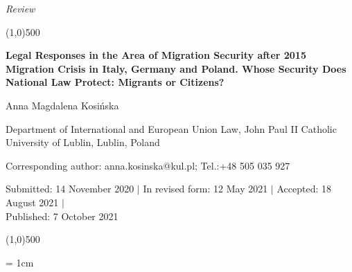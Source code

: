 \documentclass[10pt,a4paper]{article}
\begin{document}
\flushcolumns
\raggedcolumns



\pagestyle{document}
\thispagestyle{firstpage}


\vspace*{70pt}

\setlength{\parindent}{0cm}
\textit{Review}
\vspace*{-12pt}

\begin{center}
\line(1,0){500}
\end{center}

\vspace*{12pt}
\begin{flushleft}
\begin{LARGE}
\textbf{{\color{LibrelloColor} Legal Responses in the Area of Migration Security after 2015 Migration Crisis in Italy, Germany and Poland. Whose Security Does National Law Protect: Migrants or Citizens? }} 
\end{LARGE}

\vspace*{12pt}

Anna Magdalena Kosińska

\vspace*{6pt}

Department of International and European Union Law, John Paul II Catholic University of Lublin, Lublin, Poland

\vspace*{6pt}

Corresponding author: anna.kosinska@kul.pl; Tel.:+48 505 035 927 

\vspace*{6pt}

Submitted: 14 November 2020 $\mid$ In revised form: 12 May 2021 $\mid$ Accepted: 18 August 2021 $\mid$\\
Published:  7 October 2021
\end{flushleft}
\setcounter{page}{66}


\vspace*{-18pt}
\begin{center}
\line(1,0){500}
\end{center}

\vspace*{12pt}

\begingroup\leftskip= 1cm\rightskip 1cm
\end{document}
